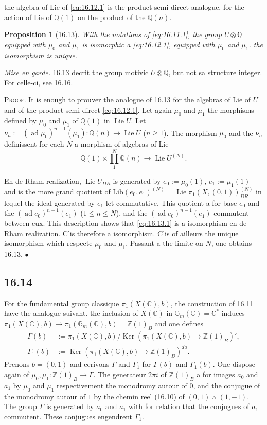 \documentclass[12pt,a4paper]{article}
\theoremstyle{plain}
\newtheorem{proposition}[theorem]{Proposition}
\theoremstyle{definition}
\theoremstyle{remark}
\DeclareMathOperator{\Ker}{Ker}
\DeclareMathOperator{\Lie}{Lie}
\DeclareMathOperator{\ad}{ad}
\newcommand{\Betti}{B}
\newcommand{\dR}{DR}
\newcommand{\Gm}{\mathbb{G}_m}
\newcommand{\ZZ}{\mathbb{Z}}
\newcommand{\QQ}{\mathbb{Q}}
\newcommand{\CC}{\mathbb{C}}
\begin{document}
the algebra of Lie of \eqref{eq:16.12.1} is the product semi-direct
analogue, for the action of Lie of $\QQ(1)$ on the product of the $\QQ(n)$.

\begin{proposition}[16.13]\label{prop:16.13}
With the notations of \ref{eq:16.11.1}, the group $U \otimes \QQ$ equipped with
$\mu_0$ and $\mu_1$ is isomorphic a \eqref{eq:16.12.1}, equipped with $\mu_0$ and
$\mu_1$. the isomorphism is unique.
\end{proposition}

\noindent \textit{Mise en garde.} 16.13 decrit the group motivic
$U \otimes \QQ$, but not sa structure integer. For celle-ci, see 16.16.

\noindent \textsc{Proof.} It is enough to prouver the analogue of 16.13 for
the algebras of Lie of $U$ and of the product semi-direct
\eqref{eq:16.12.1}. Let again $\mu_0$ and $\mu_1$ the morphisms
defined by $\mu_0$ and $\mu_1$ of $\QQ(1)$ in $\Lie U$. Let
$\nu_n := (\ad\mu_0)^{n-1}(\mu_1) : \QQ(n) \to \Lie U$ ($n \geq 1$). The
morphism $\mu_0$ and the $\nu_n$ definissent for each $N$ a morphism
of algebras of Lie
\begin{equation}\label{eq:16.13.1}
\QQ(1) \ltimes \prod_1^N \QQ(n) \to \Lie U^{(N)}.
\end{equation}

En de Rham realization, $\Lie U_{\dR}$ is generated by
$e_0 := \mu_0(1)$, $e_1 := \mu_1(1)$ and is the more grand quotient of
$\mathrm{Lib}(e_0,e_1)^{(N)} = \Lie \pi_1(X,(0,1))_{\dR}^{(N)}$ in lequel
the ideal generated by $e_1$ let commutative. This quotient a for base
$e_0$ and the $(\ad e_0)^{n-1}(e_1)$ ($1 \leq n \leq N$), and the
$(\ad e_0)^{n-1}(e_1)$ commutent between eux. This description shows that
\eqref{eq:16.13.1} is a isomorphism en de Rham realization.
C'is therefore a isomorphism. C'is of ailleurs the unique isomorphism which
respecte $\mu_0$ and $\mu_1$. Passant a the limite on $N$, one obtains
16.13. \hfill $\bullet$

\subsection*{16.14}

For the fundamental group classique $\pi_1(X(\CC),b)$, the construction of
16.11 have the analogue suivant. the inclusion of $X(\CC)$ in
$\Gm(\CC) = \CC^*$ induces
$\pi_1(X(\CC),b) \to \pi_1(\Gm(\CC),b) = \ZZ(1)_\Betti$ and one defines
\begin{align*}
\Gamma(b) &:= \pi_1(X(\CC),b)/\Ker(\pi_1(X(\CC),b) \to \ZZ(1)_\Betti)', \\
\Gamma_1(b) &:= \Ker(\pi_1(X(\CC),b) \to \ZZ(1)_\Betti)^{\mathrm{ab}}.
\end{align*}
Prenons $b = (0,1)$ and ecrivons $\Gamma$ and $\Gamma_1$ for $\Gamma(b)$ and
$\Gamma_1(b)$. One dispose again of $\mu_0, \mu_1 : \ZZ(1)_\Betti \to \Gamma$.
The generateur $2\pi i$ of $\ZZ(1)_\Betti$ a for images $a_0$ and $a_1$ by
$\mu_0$ and $\mu_1$ respectivement the monodromy autour of $0$, and the
conjugue of the monodromy autour of $1$ by the chemin reel (16.10) of
$(0,1)$ a $(1,-1)$. The group $\Gamma$ is generated by $a_0$ and $a_1$
with for relation that the conjugues of $a_1$ commutent. These conjugues
engendrent $\Gamma_1$.
\end{document}
